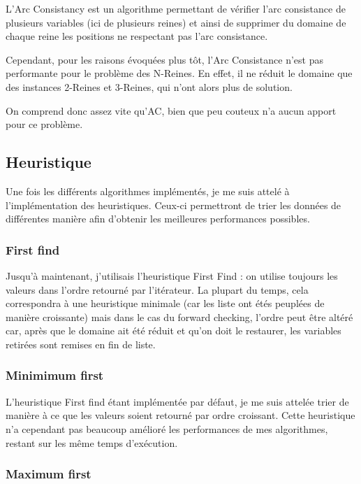 \documentclass[a4paper,10pt]{article}
\begin{document}
L'Arc Consistancy est un algorithme permettant de vérifier l'arc consistance de plusieurs variables (ici de plusieurs reines) et ainsi de supprimer du domaine de chaque reine les positions ne respectant pas l'arc consistance.

Cependant, pour les raisons évoquées plus tôt, l'Arc Consistance n'est pas performante pour le problème des N-Reines. En effet, il ne réduit le domaine que des instances 2-Reines et 3-Reines, qui n'ont alors plus de solution.

On comprend donc assez vite qu'AC, bien que peu couteux n'a aucun apport pour ce problème.

\subsection{Heuristique}

Une fois les différents algorithmes implémentés, je me suis attelé à l'implémentation des heuristiques. Ceux-ci permettront de trier les données de différentes manière afin d'obtenir les meilleures performances possibles.

\subsubsection{First find}

Jusqu'à maintenant, j'utilisais l'heuristique First Find : on utilise toujours les valeurs dans l'ordre retourné par l'itérateur. La plupart du temps, cela correspondra à une heuristique minimale (car les liste ont étés peuplées de manière croissante) mais dans le cas du forward checking, l'ordre peut être altéré car, après que le domaine ait été réduit et qu'on doit le restaurer, les variables retirées sont remises en fin de liste.

\subsubsection{Minimimum first}

L'heuristique First find étant implémentée par défaut, je me suis attelée trier de manière à ce que les valeurs soient retourné par ordre croissant. Cette heuristique n'a cependant pas beaucoup amélioré les performances de mes algorithmes, restant sur les même temps d'exécution. 

\subsubsection{Maximum first}
\end{document}
